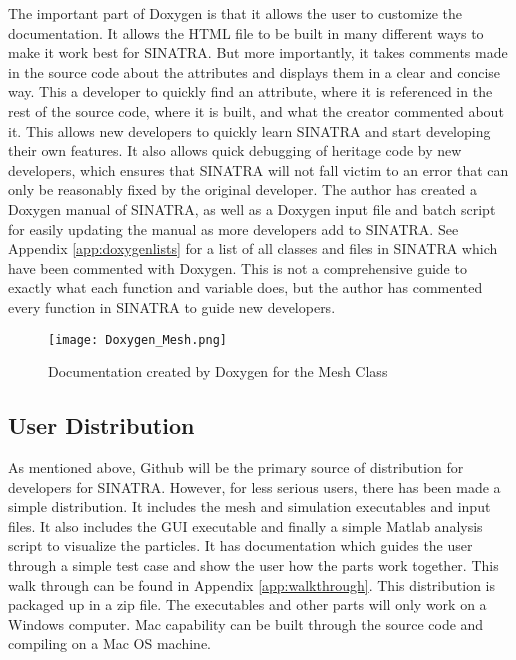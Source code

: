 \indent The important part of Doxygen is that it allows the user to customize the documentation. It allows the HTML file to be built in many different ways to make it work best for SINATRA. But more importantly, it takes comments made in the source code about the attributes and displays them in a clear and concise way. This a developer to quickly find an attribute, where it is referenced in the rest of the source code, where it is built, and what the creator commented about it. This allows new developers to quickly learn SINATRA and start developing their own features. It also allows quick debugging of heritage code by new developers, which ensures that SINATRA will not fall victim to an error that can only be reasonably fixed by the original developer. The author has created a Doxygen manual of SINATRA, as well as a Doxygen input file and batch script for easily updating the manual as more developers add to SINATRA. See Appendix \ref{app:doxygenlists} for a list of all classes and files in SINATRA which have been commented with Doxygen. This is not a comprehensive guide to exactly what each function and variable does, but the author has commented every function in SINATRA to guide new developers. 


\begin{figure}
\texttt{[image: Doxygen\_Mesh.png]}
\centering
\caption{Documentation created by Doxygen for the Mesh Class}
\label{fig:Doxygen_Mesh}
\end{figure}


\subsection{User Distribution}

As mentioned above, Github will be the primary source of distribution for developers for SINATRA. However, for less serious users, there has been made a simple distribution. It includes the mesh and simulation executables and input files. It also includes the GUI executable and finally a simple Matlab analysis script to visualize the particles. It has documentation which guides the user through a simple test case and show the user how the parts work together. This walk through can be found in Appendix \ref{app:walkthrough}. This distribution is packaged up in a zip file. The executables and other parts will only work on a Windows computer. Mac capability can be built through the source code and compiling on a Mac OS machine.\par

